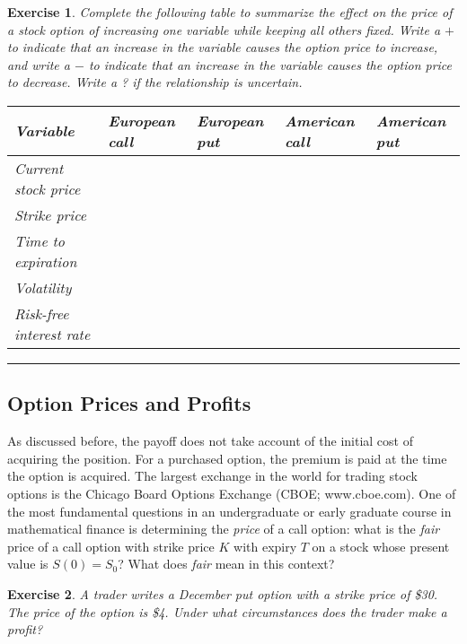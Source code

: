 \documentclass[letterpaper,10pt]{article}
\newtheorem{ex}{Exercise}
\begin{document}
\begin{ex}
Complete the following table to summarize the effect on the price of a stock option of increasing one variable while keeping all others fixed.  Write a $+$ to indicate that an increase in the variable causes the option price to increase, and write a $-$ to indicate that an increase in the variable causes the option price to decrease.  Write a ? if the relationship is uncertain.

\bigskip

\begin{tabular}{|l|l|l|l|l|}\hline
{\em Variable} & {\em European call} & {\em European put} & {\em American call} & {\em American put}\\\hline
Current stock price &&&&\\\hline
Strike price &&&&\\\hline
Time to expiration &&&&\\\hline
Volatility &&&&\\\hline
Risk-free interest rate &&&&\\\hline
\end{tabular}
\end{ex}

\bigskip

\hrule

\bigskip

\subsection{Option Prices and Profits}

\noindent As discussed before, the payoff does not take account of the initial cost of acquiring the position. For a purchased option, the premium is paid at the time the option is acquired.  The largest exchange in the world for trading stock options is the Chicago Board Options Exchange (CBOE; www.cboe.com).  One of the most fundamental questions in an undergraduate or early graduate course in mathematical finance is determining the {\em price} of a call option: what is the {\em fair} price of a call option with strike price $K$ with expiry $T$ on a stock whose present value is $S(0)=S_0$?  What does {\em fair} mean in this context?

\begin{ex}
A trader writes a December put option with a strike price of \$30.  The price of the option is \$4.  Under what circumstances does the trader make a profit?
\end{ex}
\end{document}
